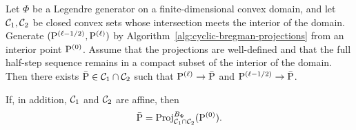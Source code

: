 \begin{prop}\label{prop-cyclic-kl-affine}
	Let $\Phi$ be a Legendre generator on a finite-dimensional convex domain, and let $\Cc_1,\Cc_2$ be closed convex sets whose intersection meets the interior of the domain. Generate $(\P^{(\ell-1/2)},\P^{(\ell)})$ by Algorithm~\ref{alg:cyclic-bregman-projections} from an interior point $\P^{(0)}$. Assume that the projections are well-defined and that the full half-step sequence remains in a compact subset of the interior of the domain. Then there exists $\bar\P\in\Cc_1\cap\Cc_2$ such that $\P^{(\ell)}\to\bar\P$ and $\P^{(\ell-1/2)}\to\bar\P$.

	If, in addition, $\Cc_1$ and $\Cc_2$ are affine, then
	\[
		\bar\P
		=
		\Proj_{\Cc_1\cap\Cc_2}^{B_\Phi}(\P^{(0)}).
	\]
\end{prop}
